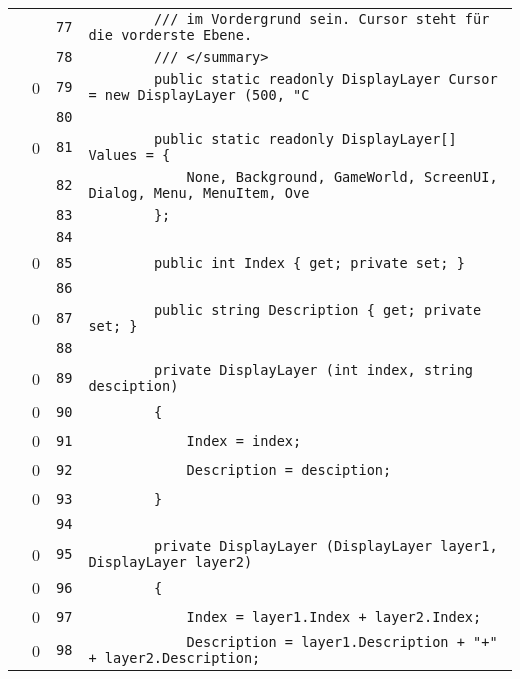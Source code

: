 \documentclass[a4paper,10pt]{article}
\begin{document}
\begin{longtable}[l]{lrrl}
\cellcolor{gray} &  & \verb~77~ & \verb~        /// im Vordergrund sein. Cursor steht für die vorderste Ebene.~\\
\cellcolor{gray} &  & \verb~78~ & \verb~        /// </summary>~\\
\cellcolor{red} & 0 & \verb~79~ & \verb~        public static readonly DisplayLayer Cursor = new DisplayLayer (500, "C~\\
\cellcolor{gray} &  & \verb~80~ & \verb~~\\
\cellcolor{red} & 0 & \verb~81~ & \verb~        public static readonly DisplayLayer[] Values = {~\\
\cellcolor{gray} &  & \verb~82~ & \verb~            None, Background, GameWorld, ScreenUI, Dialog, Menu, MenuItem, Ove~\\
\cellcolor{gray} &  & \verb~83~ & \verb~        };~\\
\cellcolor{gray} &  & \verb~84~ & \verb~~\\
\cellcolor{red} & 0 & \verb~85~ & \verb~        public int Index { get; private set; }~\\
\cellcolor{gray} &  & \verb~86~ & \verb~~\\
\cellcolor{red} & 0 & \verb~87~ & \verb~        public string Description { get; private set; }~\\
\cellcolor{gray} &  & \verb~88~ & \verb~~\\
\cellcolor{red} & 0 & \verb~89~ & \verb~        private DisplayLayer (int index, string desciption)~\\
\cellcolor{red} & 0 & \verb~90~ & \verb~        {~\\
\cellcolor{red} & 0 & \verb~91~ & \verb~            Index = index;~\\
\cellcolor{red} & 0 & \verb~92~ & \verb~            Description = desciption;~\\
\cellcolor{red} & 0 & \verb~93~ & \verb~        }~\\
\cellcolor{gray} &  & \verb~94~ & \verb~~\\
\cellcolor{red} & 0 & \verb~95~ & \verb~        private DisplayLayer (DisplayLayer layer1, DisplayLayer layer2)~\\
\cellcolor{red} & 0 & \verb~96~ & \verb~        {~\\
\cellcolor{red} & 0 & \verb~97~ & \verb~            Index = layer1.Index + layer2.Index;~\\
\cellcolor{red} & 0 & \verb~98~ & \verb~            Description = layer1.Description + "+" + layer2.Description;~\\

\end{longtable}
\end{document}
